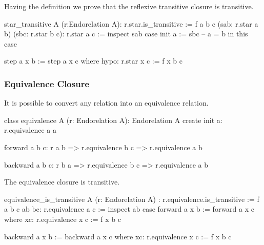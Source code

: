 Having the definition we prove that the reflexive transitive closure is
transitive.

\begin{alba}
  star_transitive A (r:Endorelation A): r.star.is_transitive :=
    f a b c (sab: r.star a b) (sbc: r.star b c): r.star a c :=
      inspect
        sab
      case
        init a :=
          sbc  -- a = b in this case

        step a x b :=
          step a x c where
            hypo: r.star x c := f x b c
\end{alba}



\subsubsection{Equivalence Closure}

It is possible to convert any relation into an equivalence relation.



\begin{alba}
  class
    equivalence A (r: Endorelation A): Endorelation A
  create
    init a:
     r.equivalence a a

    forward a b c:
      r a b => r.equivalence b c => r.equivalence a b

    backward a b c:
      r b a => r.equivalence b c => r.equivalence a b
\end{alba}


The equivalence closure is transitive.

\begin{alba}
  equivalence_is_transitive
    A (r: Endorelation A)
    : r.equivalence.is_transitive :=
    f a b c ab bc: r.equivalence a c :=
      inspect ab case
        forward a x b :=
          forward a x c where
            xc: r.equivalence x c := f x b c

        backward a x b :=
          backward a x c where
            xc: r.equivalence x c := f x b c
\end{alba}

